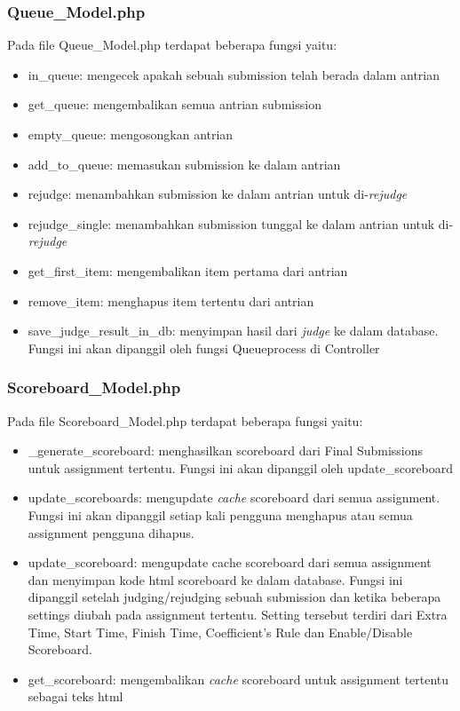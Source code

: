 \subsubsection{Queue\_Model.php}
Pada file Queue\_Model.php terdapat beberapa fungsi yaitu:
\begin{itemize}
	\item in\_queue: mengecek apakah sebuah submission telah berada dalam antrian
	\item get\_queue: mengembalikan semua antrian submission
	\item empty\_queue: mengosongkan antrian
	\item add\_to\_queue: memasukan submission ke dalam antrian
	\item rejudge: menambahkan submission ke dalam antrian untuk di-\textit{rejudge}
	\item rejudge\_single: menambahkan submission tunggal ke dalam antrian untuk di-\textit{rejudge}
	\item get\_first\_item: mengembalikan item pertama dari antrian
	\item remove\_item: menghapus item tertentu dari antrian
	\item save\_judge\_result\_in\_db: menyimpan hasil dari \textit{judge} ke dalam database. Fungsi ini akan dipanggil oleh fungsi Queueprocess di Controller
\end{itemize}

\subsubsection{Scoreboard\_Model.php}
Pada file Scoreboard\_Model.php terdapat beberapa fungsi yaitu:
\begin{itemize}
	\item \_generate\_scoreboard: menghasilkan scoreboard dari Final Submissions untuk assignment tertentu. Fungsi ini akan dipanggil oleh update\_scoreboard
	\item update\_scoreboards: mengupdate \textit{cache} scoreboard dari semua assignment. Fungsi ini akan dipanggil setiap kali pengguna menghapus atau semua assignment pengguna dihapus.
	\item update\_scoreboard: mengupdate cache scoreboard dari semua assignment dan menyimpan kode html scoreboard ke dalam database. Fungsi ini dipanggil setelah judging/rejudging sebuah submission dan ketika beberapa settings diubah pada assignment tertentu. Setting tersebut terdiri dari Extra Time, Start Time, Finish Time, Coefficient's Rule dan Enable/Disable Scoreboard.
	\item get\_scoreboard: mengembalikan \textit{cache} scoreboard untuk assignment tertentu sebagai teks html
\end{itemize}

